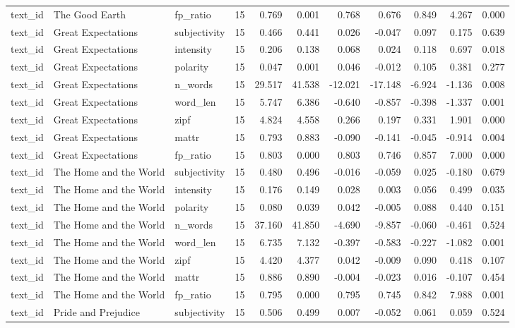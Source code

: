 \documentclass[10pt]{article}
\begin{document}
{\begin{longtable}{lllrrrrrrrr}
text\_id & The Good Earth & fp\_ratio & 15 & 0.769 & 0.001 & 0.768 & 0.676 & 0.849 & 4.267 & 0.000 \\
text\_id & Great Expectations & subjectivity & 15 & 0.466 & 0.441 & 0.026 & -0.047 & 0.097 & 0.175 & 0.639 \\
text\_id & Great Expectations & intensity & 15 & 0.206 & 0.138 & 0.068 & 0.024 & 0.118 & 0.697 & 0.018 \\
text\_id & Great Expectations & polarity & 15 & 0.047 & 0.001 & 0.046 & -0.012 & 0.105 & 0.381 & 0.277 \\
text\_id & Great Expectations & n\_words & 15 & 29.517 & 41.538 & -12.021 & -17.148 & -6.924 & -1.136 & 0.008 \\
text\_id & Great Expectations & word\_len & 15 & 5.747 & 6.386 & -0.640 & -0.857 & -0.398 & -1.337 & 0.001 \\
text\_id & Great Expectations & zipf & 15 & 4.824 & 4.558 & 0.266 & 0.197 & 0.331 & 1.901 & 0.000 \\
text\_id & Great Expectations & mattr & 15 & 0.793 & 0.883 & -0.090 & -0.141 & -0.045 & -0.914 & 0.004 \\
text\_id & Great Expectations & fp\_ratio & 15 & 0.803 & 0.000 & 0.803 & 0.746 & 0.857 & 7.000 & 0.000 \\
text\_id & The Home and the World & subjectivity & 15 & 0.480 & 0.496 & -0.016 & -0.059 & 0.025 & -0.180 & 0.679 \\
text\_id & The Home and the World & intensity & 15 & 0.176 & 0.149 & 0.028 & 0.003 & 0.056 & 0.499 & 0.035 \\
text\_id & The Home and the World & polarity & 15 & 0.080 & 0.039 & 0.042 & -0.005 & 0.088 & 0.440 & 0.151 \\
text\_id & The Home and the World & n\_words & 15 & 37.160 & 41.850 & -4.690 & -9.857 & -0.060 & -0.461 & 0.524 \\
text\_id & The Home and the World & word\_len & 15 & 6.735 & 7.132 & -0.397 & -0.583 & -0.227 & -1.082 & 0.001 \\
text\_id & The Home and the World & zipf & 15 & 4.420 & 4.377 & 0.042 & -0.009 & 0.090 & 0.418 & 0.107 \\
text\_id & The Home and the World & mattr & 15 & 0.886 & 0.890 & -0.004 & -0.023 & 0.016 & -0.107 & 0.454 \\
text\_id & The Home and the World & fp\_ratio & 15 & 0.795 & 0.000 & 0.795 & 0.745 & 0.842 & 7.988 & 0.001 \\
text\_id & Pride and Prejudice & subjectivity & 15 & 0.506 & 0.499 & 0.007 & -0.052 & 0.061 & 0.059 & 0.524 \\

\end{longtable}}
\end{document}

